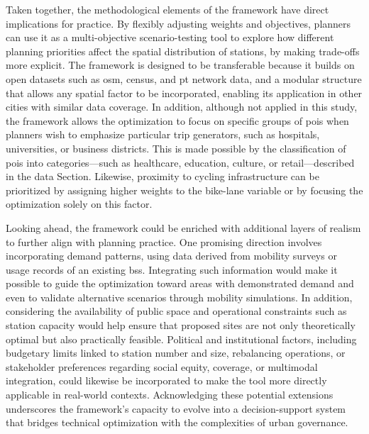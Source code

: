Taken together, the methodological elements of the framework have direct implications for practice. By flexibly adjusting weights and objectives, planners can use it as a multi-objective scenario-testing tool to explore how different planning priorities affect the spatial distribution of stations, by making trade-offs more explicit. The framework is designed to be transferable because it builds on open datasets such as \ac{osm}, census, and \ac{pt} network data, and a modular structure that allows any spatial factor to be incorporated, enabling its application in other cities with similar data coverage. In addition, although not applied in this study, the framework allows the optimization to focus on specific groups of \acp{poi} when planners wish to emphasize particular trip generators, such as hospitals, universities, or business districts. This is made possible by the classification of \acp{poi} into categories—such as healthcare, education, culture, or retail—described in the data Section. Likewise, proximity to cycling infrastructure can be prioritized by assigning higher weights to the bike-lane variable or by focusing the optimization solely on this factor.

Looking ahead, the framework could be enriched with additional layers of realism to further align with planning practice. One promising direction involves incorporating demand patterns, using data derived from mobility surveys or usage records of an existing \ac{bss}. Integrating such information would make it possible to guide the optimization toward areas with demonstrated demand and even to validate alternative scenarios through mobility simulations. In addition, considering the availability of public space and operational constraints such as station capacity would help ensure that proposed sites are not only theoretically optimal but also practically feasible. Political and institutional factors, including budgetary limits linked to station number and size, rebalancing operations, or stakeholder preferences regarding social equity, coverage, or multimodal integration, could likewise be incorporated to make the tool more directly applicable in real-world contexts. Acknowledging these potential extensions underscores the framework's capacity to evolve into a decision-support system that bridges technical optimization with the complexities of urban governance.